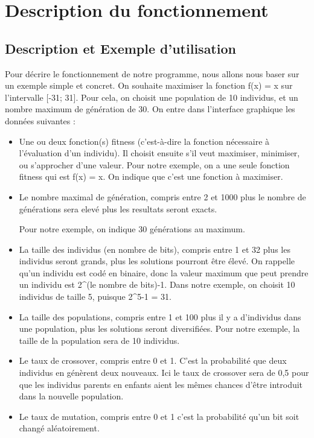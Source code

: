\documentclass[a4paper,11pt]{article}
\begin{document}
	\section{Description du fonctionnement}
		\subsection{Description et Exemple d’utilisation}
			Pour décrire le fonctionnement de notre programme, nous allons nous baser sur un exemple simple et concret.
			On souhaite maximiser la fonction f(x) = x sur l'intervalle [-31; 31].
			Pour cela, on choisit une population de 10 individus, et un nombre maximum de génération de 30.
			On entre dans l’interface graphique les données suivantes :\\
				\begin{itemize}
					\item	Une ou deux fonction(s) fitness (c’est-à-dire la fonction nécessaire à l’évaluation d’un individu). 
							Il choisit ensuite s’il veut maximiser, minimiser, ou s’approcher d’une valeur. 
							Pour notre exemple, on a une seule fonction fitness qui est f(x) = x. On indique que c’est une fonction à maximiser.

					\item 	Le nombre maximal de génération, compris entre 2 et 1000 plus le nombre de générations sera elevé plus les resultats seront exacts. 
				
							Pour notre exemple, on indique 30 générations au maximum.		
					\item	La taille des individus (en nombre de bits), compris entre 1 et 32 plus les individus seront grands, plus les solutions pourront être élevé.
							On rappelle qu’un individu est codé en binaire, donc la valeur maximum que peut prendre un individu est 2\^{}(le nombre de bits)-1.
							Dans notre exemple, on choisit 10 individus de taille 5, puisque 2\^{}5-1 = 31. 
					\item	La taille des populations, compris entre 1 et 100 plus il y a d'individus dans une population, plus les solutions seront diversifiées.
							Pour notre exemple, la taille de la population sera de 10 individus.
					\item	Le taux de crossover, compris entre 0 et 1. C'est la probabilité que deux individus en génèrent deux nouveaux.
							Ici le taux de crossover sera de 0,5 pour que les individus parents en enfants aient les mêmes chances d'être introduit dans la nouvelle population.
					\item	Le taux de mutation, compris entre 0 et 1 c'est la probabilité qu'un bit soit changé aléatoirement.


\end{itemize}
\end{document}
